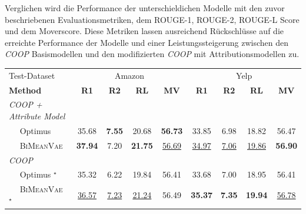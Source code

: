 Verglichen wird die Performance der unterschieldichen Modelle mit den zuvor beschriebenen Evaluationsmetriken, dem ROUGE-1, ROUGE-2, ROUGE-L Score und dem Moverscore.
Diese Metriken lassen ausreichend Rückschlüsse auf die erreichte Performance der Modelle und einer Leistungssteigerung zwischen den \textit{COOP} Basismodellen und den modifizierten \textit{COOP} mit Attributionsmodellen zu.
\begin{table}[!h]
  
    \centering
    \begin{tabular}{@{}lcccc|cccc@{}}
    \toprule
             Test-Dataset                  & \multicolumn{4}{c}{Amazon} & \multicolumn{4}{c}{Yelp} \\ 
    \textbf{Method} & \textbf{R1} & \textbf{R2} & \textbf{RL} & \textbf{MV} & \textbf{R1} & \textbf{R2} & \textbf{RL} & \textbf{MV}\\ \midrule
    
    \textit{COOP + Attribute Model}        &         &         &        &        &        &   & &     \\
    $\quad$ Optimus            &   35.68   & \textbf{7.55}  &  20.68 & \textbf{56.73} &  33.85   &  6.98  & 18.82  &  56.47  \\ 
    $\quad$ \textsc{BiMeanVae}  &   \textbf{37.94}  &   7.20    &  \textbf{21.75} & \underline{56.69} &   \underline{34.97}  & \underline{7.06}     & \underline{19.86}  &  \textbf{56.90}  \\ \midrule

    \textit{COOP}              &         &         &        &        &        & &   &    \\ %
    $\quad$ Optimus   $^{\star}$          & 35.32 &6.22 &19.84  & 56.41&  33.68& 7.00 &18.95 & 56.41\\ 
    $\quad$ \textsc{BiMeanVae}  $^{\star}$   & \underline{36.57} &\underline{7.23} &\underline{21.24} & 56.49 & \textbf{35.37} & \textbf{7.35} &\textbf{19.94} & \underline{56.78} \\ \midrule
    


\end{tabular}
\end{table}
